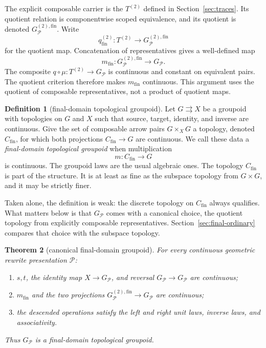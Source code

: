 \documentclass[10pt,reqno]{amsart}
\theoremstyle{definition}
\newtheorem{definition}{Definition}[section]
\theoremstyle{plain}
\newtheorem{theorem}[definition]{Theorem}
\theoremstyle{remark}
\newcommand{\Fin}{\mathrm{fin}}
\begin{document}
The explicit composable carrier is the $T^{(2)}$ defined in Section~\ref{sec:traces}.
Its quotient relation is componentwise scoped equivalence, and its quotient is
denoted $G_{\mathcal P}^{(2),\Fin}$.  Write
\[
  q_{\Fin}^{(2)}:T^{(2)}\longrightarrow G_{\mathcal P}^{(2),\Fin}
\]
for the quotient map.  Concatenation of representatives gives a well-defined
map
\[
  m_{\Fin}:G_{\mathcal P}^{(2),\Fin}\longrightarrow G_{\mathcal P}.
\]
The composite $q\circ\mu:T^{(2)}\to G_{\mathcal P}$ is continuous and
constant on equivalent pairs.  The quotient criterion therefore makes
$m_{\Fin}$ continuous.  This argument uses the quotient of composable
representatives, not a product of quotient maps.

\begin{definition}[final-domain topological groupoid]
Let $G\rightrightarrows X$ be a groupoid with topologies on $G$ and $X$
such that source, target, identity, and inverse are continuous.
Give the set of composable arrow pairs $G\times_XG$ a topology, denoted
$C_{\mathrm{fin}}$, for which both projections $C_{\mathrm{fin}}\to G$ are
continuous.  We call these data a
\emph{final-domain topological groupoid} when multiplication
\[
  m:C_{\mathrm{fin}}\longrightarrow G
\]
is continuous.  The groupoid laws are the usual algebraic ones.  The topology
$C_{\mathrm{fin}}$ is part of the structure.  It is at least as fine as the
subspace topology from $G\times G$, and it may be strictly finer.
\end{definition}

Taken alone, the definition is weak: the discrete topology on
$C_{\mathrm{fin}}$ always qualifies.  What matters below is that
$G_{\mathcal P}$ comes with a canonical choice, the quotient topology from
explicitly composable representatives.  Section~\ref{sec:final-ordinary} compares that choice with
the subspace topology.

\begin{theorem}[canonical final-domain groupoid]
\label{thm:final-groupoid}
For every continuous geometric rewrite presentation $\mathcal P$:
\begin{enumerate}[label=(\alph*),leftmargin=2.2em]
\item $s,t$, the identity map $X\to G_{\mathcal P}$, and reversal
  $G_{\mathcal P}\to G_{\mathcal P}$ are continuous;
\item $m_{\Fin}$ and the two projections
  $G_{\mathcal P}^{(2),\Fin}\to G_{\mathcal P}$ are continuous;
\item the descended operations satisfy the left and right unit laws, inverse
  laws, and associativity.
\end{enumerate}
Thus $G_{\mathcal P}$ is a final-domain topological groupoid.
\end{theorem}
\end{document}

